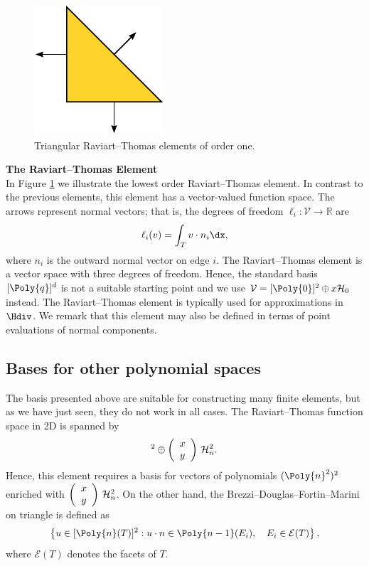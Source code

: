 \begin{figure}
  \centering
  \includegraphics[width=\largefig]{chapters/kirby-6/pdf/RT0.pdf}
  \caption{Triangular Raviart--Thomas elements of order one.}
  \label{RaviartThomas}
\end{figure}

\begin{example}{\bf{The Raviart--Thomas Element}} \\
In Figure \ref{RaviartThomas} we illustrate the lowest order
Raviart--Thomas element.  In contrast to the previous elements, this
element has a vector-valued function space.  The arrows represent normal
vectors; that is, the degrees of freedom $\ell_i : \mathcal{V} \rightarrow
\mathbb{R}$ are
\begin{equation}
\ell_i ( v) = \int_{T} v \cdot n_i  \dx ,
\end{equation}
where $n_i$ is the outward normal vector on edge $i$.  The Raviart--Thomas
element is a vector space with three degrees of freedom. Hence, the
standard basis $[\Poly{q}]^d$ is not a suitable starting point and we use
$\mathcal{V} = [\Poly{0}]^2 \oplus x \H_0$ instead.  The Raviart--Thomas
element is typically used for approximations in $\Hdiv$.  We remark
that this element may also be defined in terms of point evaluations of
normal components.
\end{example}

\subsection{Bases for other polynomial spaces}
The basis presented above are suitable for constructing many finite
elements, but as we have just seen, they do not work in all cases.
The Raviart--Thomas function space in 2D is spanned by
\begin{equation}
[\Poly{n}]^2 \oplus
\left(\begin{array}{c} x \\y \end{array} \right) \, \H^2_n.
\end{equation}
Hence, this element requires a basis for vectors of polynomials
$(\Poly{n}^2)^2$ enriched with $\left(\begin{array}{c} x \\y \end{array}
\right) \, {\mathcal{H}}^2_n$.  On the other hand, the Brezzi--Douglas--Fortin--Marini
on triangle is defined as
\begin{equation}
\left\{
u \in [\Poly{n}(T)]^2 : u \cdot n \in \Poly{n-1}(E_i), \quad E_i \in \mathcal{E}(T)
\right\},
\end{equation}
where $\mathcal{E}(T)$ denotes the facets of $T$.

